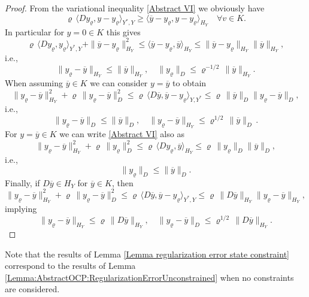 \documentclass{article}
\numberwithin{equation}{section}
\begin{document}
\begin{proof}
  From the variational inequality \eqref{Abstract VI} we obviously have
  \[
    \varrho \, \langle D y_\varrho , y - y_\varrho \rangle_{Y^*,Y} \geq
    \langle \overline{y} - y_\varrho , y - y_\varrho \rangle_{H_Y} \quad
    \forall v \in K .
  \]
  In particular for $y=0 \in K$ this gives
  \[
    \varrho \, \langle D y_\varrho , y_\varrho \rangle_{Y^*,Y} +
    \| \overline{y} - y_\varrho \|^2_{H_Y} \leq
    \langle \overline{y} - y_\varrho , \overline{y} \rangle_{H_Y}
    \leq \| \overline{y} - y_\varrho \|_{H_Y}
    \| \overline{y} \|_{H_Y},
  \]
  i.e.,
  \[
    \| y_\varrho - \overline{y} \|_{H_Y} \leq
    \| \overline{y} \|_{H_Y}, \quad
    \| y_\varrho \|_D \leq \varrho^{-1/2} \, \| \overline{y} \|_{H_Y} .
  \]
  When assuming $\overline{y} \in K$ we can consider $y=\overline{y}$
  to obtain
  \[
    \| y_\varrho - \overline{y} \|^2_{H_Y}
    +
    \varrho \, \| y_\varrho - \overline{y} \|_D^2 
    \leq
    \varrho \, \langle D \overline{y} ,
    \overline{y} - y_\varrho \rangle_{Y,Y^*}
    \leq
    \varrho \, \|\overline{y} \|_D \| y_\varrho - \overline{y} \|_D,
  \]
  i.e.,
  \[
    \| y_\varrho - \overline{y} \|_D \leq \| \overline{y} \|_D, \quad
    \| y_\varrho - \overline{y} \|_{H_Y} \leq \varrho^{1/2} \,
    \| \overline{y} \|_D \, .
  \]
  For $y = \overline{y} \in K$ we can write \eqref{Abstract VI} also as
  \[
    \| y_\varrho - \overline{y} \|^2_{H_Y} +
    \varrho \, \| y_\varrho \|_D^2
    \leq
    \varrho \, \langle D y_\varrho , \overline{y} \rangle_{H_Y}
    \leq \varrho \, \| y_\varrho \|_D \| \overline{y} \|_D,
  \]
  i.e.,
  \[
    \| y_\varrho \|_D \leq \| \overline{y} \|_D .
  \]
  Finally, if $D \overline{y} \in H_Y$ for $\overline{y} \in K$, then
  \[
    \| y_\varrho - \overline{y} \|^2_{H_Y}
    +
    \varrho \, \| y_\varrho - \overline{y} \|_D^2 
    \leq
    \varrho \, \langle D \overline{y} ,
    \overline{y} - y_\varrho \rangle_{Y^*,Y} \leq
    \varrho \, \| D \overline{y} \|_{H_Y}
    \| y_\varrho - \overline{y} \|_{H_Y},
  \]
  implying
  \[
    \| y_\varrho - \overline{y} \|_{H_Y} \leq \varrho \,
    \| D \overline{y} \|_{H_Y}, \quad
    \| y_\varrho - \overline{y} \|_D \leq
    \varrho^{1/2} \, \| D \overline{y} \|_{H_Y} .
  \]
\end{proof}

\noindent
Note that the results of Lemma
\ref{Lemma regularization error state constraint} correspond to the
results of Lemma \ref{Lemma:AbstractOCP:RegularizationErrorUnconstrained}
when no constraints are considered.
\end{document}
